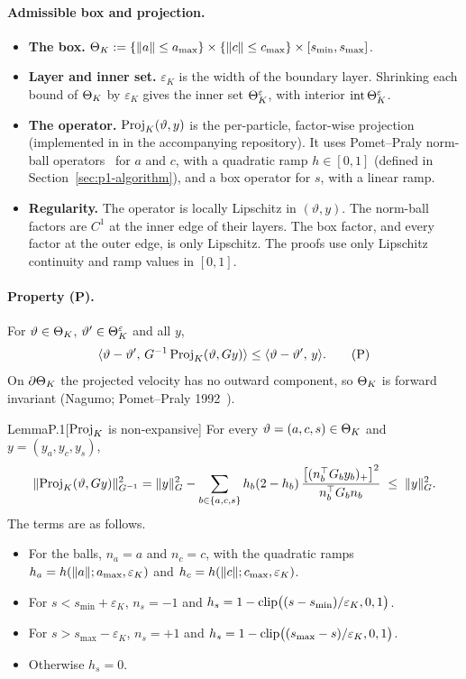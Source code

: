 \paragraph{Admissible box and projection.}
\begin{itemize}
  \item \textbf{The box.}
    $\Theta_K := \{\lVert a\rVert\le a_{\max}\}\times\{\lVert c\rVert\le c_{\max}\}\times[s_{\min},s_{\max}]$.
  \item \textbf{Layer and inner set.} $\varepsilon_K$ is the width of the boundary layer. Shrinking each bound of
    $\Theta_K$ by $\varepsilon_K$ gives the inner set $\Theta_K^{\varepsilon}$, with interior $\operatorname{int}\Theta_K^{\varepsilon}$.
  \item \textbf{The operator.} $\operatorname{Proj}_K(\vartheta,y)$ is the per-particle, factor-wise projection (implemented in
     in the accompanying repository). It uses Pomet--Praly norm-ball
    operators~\cite{pp1992} for $a$ and $c$, with a quadratic ramp $h\in[0,1]$ (defined in Section~\ref{sec:p1-algorithm}), and a box operator for $s$, with a
    linear ramp.
  \item \textbf{Regularity.} The operator is locally Lipschitz in $(\vartheta,y)$. The norm-ball factors are $C^1$ at
    the inner edge of their layers. The box factor, and every factor at the outer edge, is only Lipschitz. The proofs
    use only Lipschitz continuity and ramp values in $[0,1]$.
\end{itemize}

\paragraph{Property (P).}
For $\vartheta\in\Theta_K$, $\vartheta'\in\Theta_K^{\varepsilon}$ and all $y$,
\begin{equation}\label{eq:setting:P}
  \langle \vartheta-\vartheta',\, G^{-1}\operatorname{Proj}_K(\vartheta,Gy)\rangle \le \langle \vartheta-\vartheta',\, y\rangle.
  \tag{P}
\end{equation}
On $\partial\Theta_K$ the projected velocity has no outward component, so $\Theta_K$ is forward invariant (Nagumo;
Pomet--Praly 1992~\cite{pp1992}).

\begin{thm}{Lemma}{P.1}[$\operatorname{Proj}_K$ is non-expansive]
For every $\vartheta = (a,c,s)\in\Theta_K$ and $y = (y_a,y_c,y_s)$,
\[
  \lVert \operatorname{Proj}_K(\vartheta,Gy)\rVert_{G^{-1}}^2
  = \lVert y\rVert_G^2 - \sum_{b\in\{a,c,s\}} h_b(2-h_b)\,\frac{\bigl[(n_b^\top G_b y_b)_+\bigr]^2}{n_b^\top G_b n_b}
  \;\le\; \lVert y\rVert_G^2 .
\]
The terms are as follows.
\begin{itemize}
  \item For the balls, $n_a = a$ and $n_c = c$, with the quadratic ramps $h_a = h(\lVert a\rVert;a_{\max},\varepsilon_K)$ and
    $h_c = h(\lVert c\rVert;c_{\max},\varepsilon_K)$.
  \item For $s < s_{\min}+\varepsilon_K$, $n_s = -1$ and $h_s = 1-\operatorname{clip}\bigl((s-s_{\min})/\varepsilon_K,0,1\bigr)$.
  \item For $s > s_{\max}-\varepsilon_K$, $n_s = +1$ and $h_s = 1-\operatorname{clip}\bigl((s_{\max}-s)/\varepsilon_K,0,1\bigr)$.
  \item Otherwise $h_s = 0$.
\end{itemize}
\end{thm}

